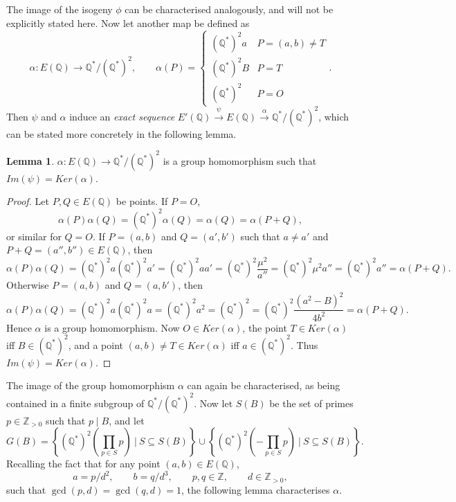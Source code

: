 \documentclass{article}
\newcommand{\Z}{\mathbb{Z}}
\newcommand{\Q}{\mathbb{Q}}
\newcommand{\rb}[1]{\left( #1 \right)}
\newcommand{\cb}[1]{\left\{ #1 \right\}}
\theoremstyle{definition}\newtheorem*{definition}{Definition}
\theoremstyle{definition}\newtheorem*{example}{Example}
\theoremstyle{definition}\newtheorem*{remark}{Remark}
\newtheorem{lemma}[proposition]{Lemma}
\begin{document}
The image of the isogeny $ \phi $ can be characterised analogously, and will not be explicitly stated here. Now let another map be defined as
$$ \alpha : E\rb{\Q} \to \Q^* / \rb{\Q^*}^2, \qquad \alpha\rb{P} = \begin{cases} \rb{\Q^*}^2a & P = \rb{a, b} \ne T \\ \rb{\Q^*}^2B & P = T \\ \rb{\Q^*}^2 & P = O \end{cases}. $$
Then $ \psi $ and $ \alpha $ induce an \emph{exact sequence} $ E'\rb{\Q} \xrightarrow{\psi} E\rb{\Q} \xrightarrow{\alpha} \Q^* / \rb{\Q^*}^2 $, which can be stated more concretely in the following lemma.

\begin{lemma}
$ \alpha : E\rb{\Q} \to \Q^* / \rb{\Q^*}^2 $ is a group homomorphism such that $ Im\rb{\psi} = Ker\rb{\alpha} $.
\end{lemma}

\begin{proof}
Let $ P, Q \in E\rb{\Q} $ be points. If $ P = O $,
$$ \alpha\rb{P}\alpha\rb{Q} = \rb{\Q^*}^2\alpha\rb{Q} = \alpha\rb{Q} = \alpha\rb{P + Q}, $$
or similar for $ Q = O $. If $ P = \rb{a, b} $ and $ Q = \rb{a', b'} $ such that $ a \ne a' $ and $ P + Q = \rb{a'', b''} \in E\rb{\Q} $, then
$$ \alpha\rb{P}\alpha\rb{Q} = \rb{\Q^*}^2a\rb{\Q^*}^2a' = \rb{\Q^*}^2aa' = \rb{\Q^*}^2\dfrac{\mu^2}{a''} = \rb{\Q^*}^2\mu^2a'' = \rb{\Q^*}^2a'' = \alpha\rb{P + Q}. $$
Otherwise $ P = \rb{a, b} $ and $ Q = \rb{a, b'} $, then
$$ \alpha\rb{P}\alpha\rb{Q} = \rb{\Q^*}^2a\rb{\Q^*}^2a = \rb{\Q^*}^2a^2 = \rb{\Q^*}^2 = \rb{\Q^*}^2\dfrac{\rb{a^2 - B}^2}{4b^2} = \alpha\rb{P + Q}. $$
Hence $ \alpha $ is a group homomorphism. Now $ O \in Ker\rb{\alpha} $, the point $ T \in Ker\rb{\alpha} $ iff $ B \in \rb{\Q^*}^2 $, and a point $ \rb{a, b} \ne T \in Ker\rb{\alpha} $ iff $ a \in \rb{\Q^*}^2 $. Thus $ Im\rb{\psi} = Ker\rb{\alpha} $.
\end{proof}

The image of the group homomorphism $ \alpha $ can again be characterised, as being contained in a finite subgroup of $ \Q^* / \rb{\Q^*}^2 $. Now let $ S\rb{B} $ be the set of primes $ p \in \Z_{> 0} $ such that $ p \mid B $, and let
$$ G\rb{B} = \cb{\rb{\Q^*}^2\rb{\prod_{p \in S} p} \ \Bigg| \ S \subseteq S\rb{B}} \cup \cb{\rb{\Q^*}^2\rb{-\prod_{p \in S} p} \ \Bigg| \ S \subseteq S\rb{B}}. $$
Recalling the fact that for any point $ \rb{a, b} \in E\rb{\Q} $,
$$ a = p / d^2, \qquad b = q / d^3, \qquad p, q \in \Z, \qquad d \in \Z_{> 0}, $$ such that $ \gcd\rb{p, d} = \gcd\rb{q, d} = 1 $, the following lemma characterises $ \alpha $.
\end{document}

